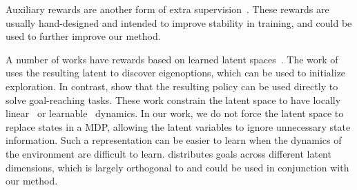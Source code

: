 Auxiliary rewards are another form of extra supervision~\cite{jaderberg2016auxiliary, shelhamer2016loss}.
These rewards are usually hand-designed and intended to improve stability in training, and could be used to further improve our method.

A number of works have rewards based on learned latent spaces~\cite{watter2015embed, ha2018world, machado2018eigenoption, thomas2017independentlycontrollable}.
The work of \cite{machado2018eigenoption} uses the resulting latent to discover eigenoptions, which can be used to initialize exploration.
In contrast, show that the resulting policy can be used directly to solve goal-reaching tasks.
These work constrain the latent space to have locally linear~\cite{watter2015embed} or learnable~\cite{ha2018world} dynamics.
In our work, we do not force the latent space to replace states in a MDP, allowing the latent variables to ignore unnecessary state information.
Such a representation can be easier to learn when the dynamics of the environment are difficult to learn.
\cite{thomas2017independentlycontrollable} distributes goals across different latent dimensions, which is largely orthogonal to and could be used in conjunction with our method.



